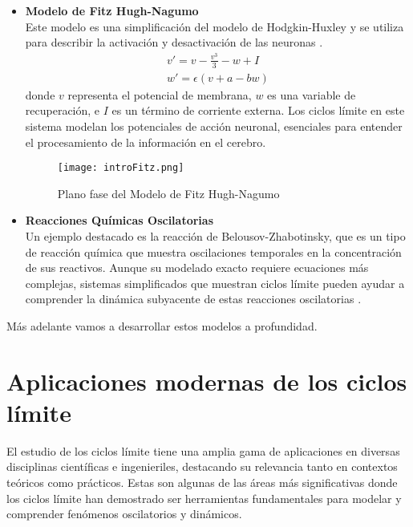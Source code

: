 \begin{itemize}
	\newpage

	\item \textbf{Modelo de Fitz Hugh-Nagumo}\\

	Este modelo es una simplificación del modelo de Hodgkin-Huxley y se utiliza para describir la activación y desactivación de las neuronas \cite{fitzhugh1961impulses, nagumo1962active}.
	\begin{equation}
		\begin{matrix}
			v'=v-\frac{v^3}{3}-w+I\\
			w'=\epsilon\left(v+a-bw\right)
		\end{matrix}
	\end{equation}
	donde $v$ representa el potencial de membrana, $w$ es una variable de recuperación, e $I$ es un término de corriente externa. Los ciclos límite en este sistema modelan los potenciales de acción neuronal, esenciales para entender el procesamiento de la información en el cerebro.

	\begin{figure}[h]
		\centering
		\texttt{[image: introFitz.png]}
		\caption{Plano fase del Modelo de Fitz Hugh-Nagumo}
        \label{fig:introFitz}
	\end{figure}

	\newpage

	\item \textbf{Reacciones Químicas Oscilatorias}\\

	Un ejemplo destacado es la reacción de Belousov-Zhabotinsky, que es un tipo de reacción química que muestra oscilaciones temporales en la concentración de sus reactivos. Aunque su modelado exacto requiere ecuaciones más complejas, sistemas simplificados que muestran ciclos límite pueden ayudar a comprender la dinámica subyacente de estas reacciones oscilatorias \cite{zhabotinsky1964periodic}.
\end{itemize}
Más adelante vamos a desarrollar estos modelos a profundidad.

\section{Aplicaciones modernas de los ciclos límite}

El estudio de los ciclos límite tiene una amplia gama de aplicaciones en diversas disciplinas científicas e ingenieriles, destacando su relevancia tanto en contextos teóricos como prácticos. Estas son algunas de las áreas más significativas donde los ciclos límite han demostrado ser herramientas fundamentales para modelar y comprender fenómenos oscilatorios y dinámicos.

